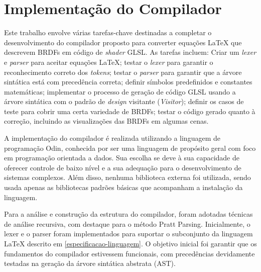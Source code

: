 \section{Implementação do Compilador} \label{compiladorimplementacao}

Este trabalho envolve várias tarefas-chave destinadas a completar o desenvolvimento do compilador proposto para converter equações \LaTeX{}  que descrevem BRDFs em código de \textit{shader} GLSL. As tarefas incluem: Criar um \textit{lexer} e \textit{parser} para aceitar equações \LaTeX{}; testar o \textit{lexer} para garantir o reconhecimento correto dos \textit{tokens}; testar o \textit{parser} para garantir que a árvore sintática está com precedência correta; definir símbolos predefinidos e constantes matemáticas; implementar o processo de geração de código GLSL usando a árvore sintática com o padrão de \textit{design} visitante (\textit{Visitor}); definir os casos de teste para cobrir uma certa variedade de BRDFs; testar o código gerado quanto à correção, incluindo as visualizações das BRDFs em algumas cenas.


A implementação do compilador é realizada utilizando a linguagem de programação Odin, conhecida por ser uma linguagem de propósito geral com foco em programação orientada a dados. Sua escolha se deve à sua capacidade de oferecer controle de baixo nível e a sua adequação para o desenvolvimento de sistemas complexos. Além disso, nenhuma biblioteca externa foi utilizada, sendo usada apenas as bibliotecas padrões básicas que acompanham a instalação da linguagem.



Para a análise e construção da estrutura do compilador, foram adotadas técnicas de análise recursiva, com destaque para o método Pratt Parsing. Inicialmente, o lexer e o parser foram implementados para suportar o subconjunto da linguagem \LaTeX{} descrito em \autoref{especificacao-linguagem}. O objetivo inicial foi garantir que os fundamentos do compilador estivessem funcionais, com precedências devidamente testadas na geração da árvore sintática abstrata (AST).

